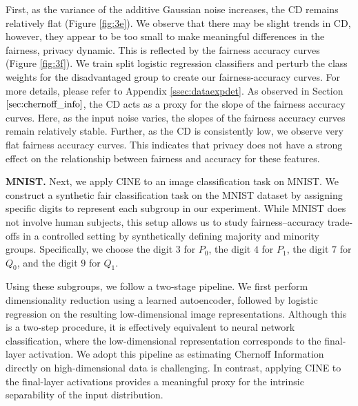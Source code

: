 \documentclass[11pt,letterpaper]{article}
\begin{document}
First, as the variance of the additive Gaussian noise increases, the CD remains relatively flat (Figure \ref{fig:3e}). We observe that there may be slight trends in CD, however, they appear to be too small to make meaningful differences in the fairness, privacy dynamic. This is reflected by the fairness accuracy curves (Figure \ref{fig:3f}). We train split logistic regression classifiers and perturb the class weights for the disadvantaged group to create our fairness-accuracy curves. For more details, please refer to Appendix \ref{ssec:dataexpdet}. As observed in Section $\ref{sec:chernoff_info}$, the CD acts as a proxy for the slope of the fairness accuracy curves. Here, as the input noise varies, the slopes of the fairness accuracy curves remain relatively stable. Further, as the CD is consistently low, we observe very flat fairness accuracy curves. This indicates that privacy does not have a strong effect on the relationship between fairness and accuracy for these features.



\textbf{MNIST.} Next, we apply CINE to an image classification task on MNIST. We construct a synthetic fair classification task on the MNIST dataset by assigning specific digits to represent each subgroup in our experiment. While MNIST does not involve human subjects, this setup allows us to study fairness–accuracy trade-offs in a controlled setting by synthetically defining majority and minority groups. Specifically, we choose the digit $3$ for $P_0$, the digit $4$ for $P_1$, the digit $7$ for $Q_0$, and the digit $9$ for $Q_1$. 

Using these subgroups, we follow a two-stage pipeline. We first perform dimensionality reduction using a learned autoencoder, followed by logistic regression on the resulting low-dimensional image representations. Although this is a two-step procedure, it is effectively equivalent to neural network classification, where the low-dimensional representation corresponds to the final-layer activation. We adopt this pipeline as estimating Chernoff Information directly on high-dimensional data is challenging. In contrast, applying CINE to the final-layer activations provides a meaningful proxy for the intrinsic separability of the input distribution.
\end{document}

